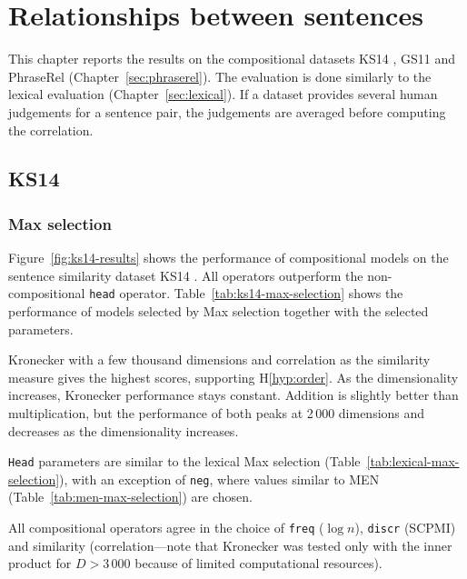 \chapter{Relationships between sentences}
\label{sec:sentential}

This chapter reports the results on the compositional datasets KS14 \cite{kartsadrqpl2014}, GS11 \cite{Grefenstette:2011:ETV:2140490.2140497} and PhraseRel (Chapter~\ref{sec:phraserel}).\footnotemark{} The evaluation is done similarly to the lexical evaluation (Chapter~\ref{sec:lexical}). If a dataset provides several human judgements for a sentence pair, the judgements are averaged before computing the correlation.


\section{KS14}
\label{sec:ks14}

\subsection{Max selection}
\label{sec:max-selection-ks14}

Figure~\ref{fig:ks14-results} shows the performance of compositional models on the sentence similarity dataset KS14 \cite{kartsadrqpl2014}. All operators outperform the non-compositional \texttt{head} operator. Table~\ref{tab:ks14-max-selection} shows the performance of models selected by Max selection together with the selected parameters.

Kronecker with a few thousand dimensions and correlation as the similarity measure gives the highest scores, supporting H\ref{hyp:order}. As the dimensionality increases, Kronecker performance stays constant. Addition is slightly better than multiplication, but the performance of both peaks at 2\,000 dimensions and decreases as the dimensionality increases.



\texttt{Head} parameters are similar to the lexical Max selection (Table~\ref{tab:lexical-max-selection}), with an exception of \texttt{neg}, where values similar to MEN (Table~\ref{tab:men-max-selection}) are chosen.

All compositional operators agree in the choice of \texttt{freq} ($\log n$), \texttt{discr} (SCPMI) and similarity (correlation---note that Kronecker was tested only with the inner product for $D > 3\,000$ because of limited computational resources).

